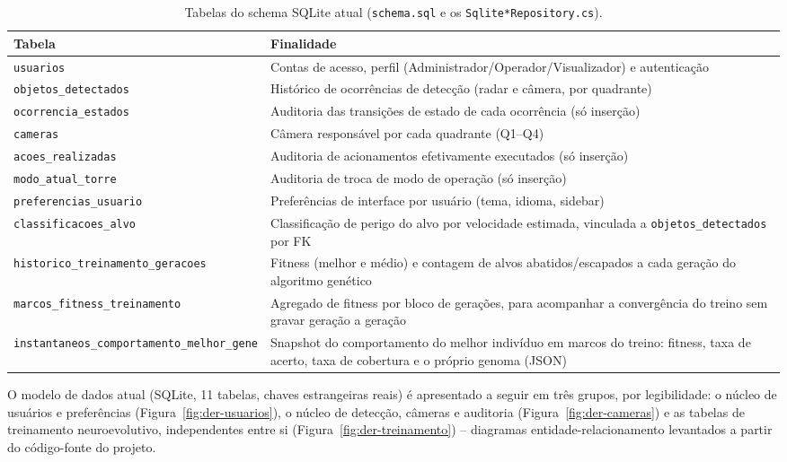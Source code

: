 \documentclass[12pt,a4paper]{article}
\begin{document}
\begin{table}[htbp]
  \centering
  \caption{Tabelas do schema SQLite atual (\texttt{schema.sql} e os \texttt{Sqlite*Repository.cs}).}
  \label{tab:tabelas-sqlite}
  \small
  \renewcommand{\arraystretch}{1.2}
  \begin{tabular}{p{4.6cm}p{7.6cm}}
    \hline
    \textbf{Tabela} & \textbf{Finalidade} \\
    \hline
    \texttt{usuarios} & Contas de acesso, perfil (Administrador/Operador/Visualizador) e
    autenticação \\
    \texttt{objetos\_detectados} & Histórico de ocorrências de detecção (radar e câmera, por
    quadrante) \\
    \texttt{ocorrencia\_estados} & Auditoria das transições de estado de cada ocorrência
    (só inserção) \\
    \texttt{cameras} & Câmera responsável por cada quadrante (Q1--Q4) \\
    \texttt{acoes\_realizadas} & Auditoria de acionamentos efetivamente executados (só inserção) \\
    \texttt{modo\_atual\_torre} & Auditoria de troca de modo de operação (só inserção) \\
    \texttt{preferencias\_usuario} & Preferências de interface por usuário (tema, idioma,
    sidebar) \\
    \texttt{classificacoes\_alvo} & Classificação de perigo do alvo por velocidade estimada,
    vinculada a \texttt{objetos\_detectados} por FK \\
    \texttt{historico\_treinamento\_\allowbreak geracoes} & Fitness (melhor e médio) e contagem de
    alvos abatidos/escapados a cada geração do algoritmo genético \\
    \texttt{marcos\_fitness\_\allowbreak treinamento} & Agregado de fitness por bloco de gerações, para
    acompanhar a convergência do treino sem gravar geração a geração \\
    \texttt{instantaneos\_\allowbreak comportamento\_\allowbreak melhor\_gene} & Snapshot do comportamento do melhor
    indivíduo em marcos do treino: fitness, taxa de acerto, taxa de cobertura e o próprio genoma
    (JSON) \\
    \hline
  \end{tabular}
\end{table}

O modelo de dados atual (SQLite, 11 tabelas, chaves estrangeiras reais) é apresentado a seguir em
três grupos, por legibilidade: o núcleo de usuários e preferências (Figura~\ref{fig:der-usuarios}),
o núcleo de detecção, câmeras e auditoria (Figura~\ref{fig:der-cameras}) e as tabelas de
treinamento neuroevolutivo, independentes entre si (Figura~\ref{fig:der-treinamento}) -- diagramas
entidade-relacionamento levantados a partir do código-fonte do projeto.
\end{document}
